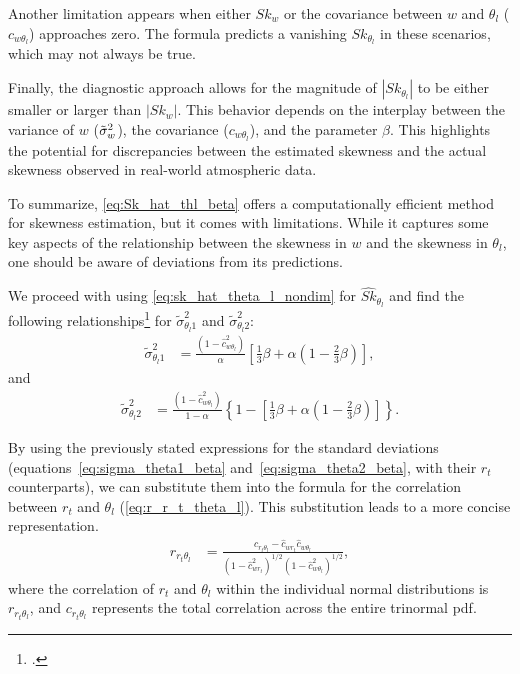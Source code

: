 Another limitation appears when either $Sk_w$
or the covariance between $w$ and $\theta_l$ ($c_{w \theta_l}$) approaches zero.
The formula predicts a vanishing $Sk_{\theta_l}$ in these scenarios,
which may not always be true.

Finally, the diagnostic approach allows for the magnitude of $\left| Sk_{\theta_l} \right|$
to be either smaller or larger than $\left| Sk_w \right|$.
This behavior depends on the interplay between the variance of $w$ (${\tilde{\sigma}_w}^2$),
the covariance ($c_{w \theta_l}$),
and the parameter $\beta$.
This highlights the potential for discrepancies between the estimated skewness
and the actual skewness observed in real-world atmospheric data.

To summarize, \cref{eq:Sk_hat_thl_beta} offers a computationally efficient method for skewness estimation,
but it comes with limitations.
While it captures some key aspects of the relationship between the skewness in $w$
and the skewness in $\theta_l$,
one should be aware of deviations from its predictions.

We proceed with using \cref{eq:sk_hat_theta_l_nondim} for $\widehat{Sk}_{\theta_l}$
and find the following relationships\footcite{larson2005using}
for $\tilde{\sigma}_{\theta_l 1}^2$ and $\tilde{\sigma}_{\theta_l 2}^2$:
\begin{align}
    \label{eq:sigma_theta1_beta}
    \tilde{\sigma}_{\theta_l 1}^2
    &= \frac{\left(1 - \widehat{c}_{w \theta_l}^2\right)}{\alpha} \left[\frac{1}{3} \beta + \alpha \left(1 - \frac{2}{3} \beta\right)\right],
\end{align}
and
\begin{align}
    \label{eq:sigma_theta2_beta}
    \tilde{\sigma}_{\theta_l 2}^2
    &= \frac{\left(1 - \widehat{c}_{w \theta_l}^2\right)} {1 - \alpha} \left\{1 - \left[\frac{1}{3}\beta + \alpha \left(1 - \frac{2}{3} \beta \right)\right]\right\}.
\end{align}

By using the previously stated expressions for the standard deviations
(equations~\eqref{eq:sigma_theta1_beta} and~\eqref{eq:sigma_theta2_beta},
with their $r_t$ counterparts),
we can substitute them into the formula for the correlation between
$r_t$ and $\theta_l$ (\cref{eq:r_r_t_theta_l}).
This substitution leads to a more concise representation.
\begin{align}
    \label{eq:r_r_t_theta_l_beta}
    r_{r_t \theta_l}
    &= \frac{c_{r_t \theta_l} - \widehat{c}_{w r_t} \widehat{c}_{w \theta_l}}
    {\left(1 - \widehat{c}_{w r_t}^2\right)^{1/2} \left(1 - \widehat{c}_{w \theta_l}^2\right)^{1/2}},
\end{align}
where the correlation of $r_t$ and $\theta_l$ within the individual normal distributions is $r_{r_t \theta_l}$,
and $c_{r_t \theta_l}$ represents the total correlation across the entire trinormal \gls{pdf}.

